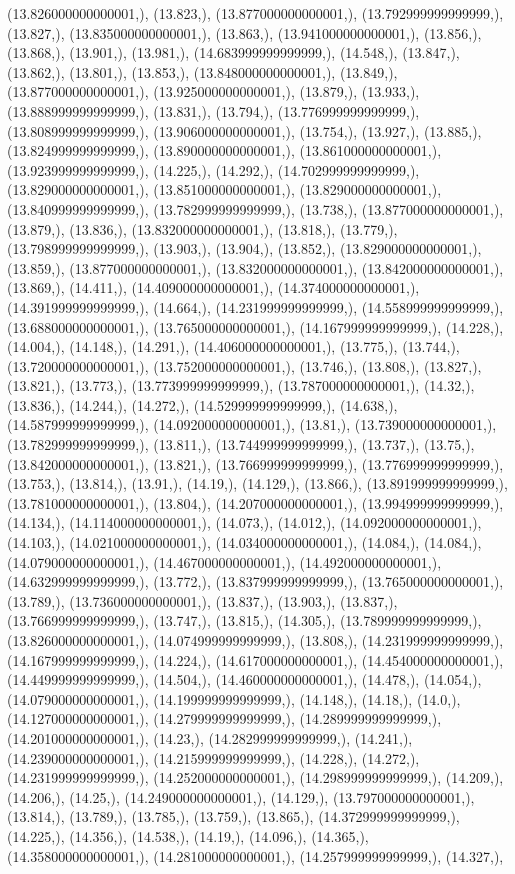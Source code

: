 \documentclass{article}
\begin{document}
(13.826000000000001,), (13.823,), (13.877000000000001,), (13.792999999999999,), (13.827,), (13.835000000000001,), (13.863,), (13.941000000000001,), (13.856,), (13.868,), (13.901,), (13.981,), (14.683999999999999,), (14.548,), (13.847,), (13.862,), (13.801,), (13.853,), (13.848000000000001,), (13.849,), (13.877000000000001,), (13.925000000000001,), (13.879,), (13.933,), (13.888999999999999,), (13.831,), (13.794,), (13.776999999999999,), (13.808999999999999,), (13.906000000000001,), (13.754,), (13.927,), (13.885,), (13.824999999999999,), (13.890000000000001,), (13.861000000000001,), (13.923999999999999,), (14.225,), (14.292,), (14.702999999999999,), (13.829000000000001,), (13.851000000000001,), (13.829000000000001,), (13.840999999999999,), (13.782999999999999,), (13.738,), (13.877000000000001,), (13.879,), (13.836,), (13.832000000000001,), (13.818,), (13.779,), (13.798999999999999,), (13.903,), (13.904,), (13.852,), (13.829000000000001,), (13.859,), (13.877000000000001,), (13.832000000000001,), (13.842000000000001,), (13.869,), (14.411,), (14.409000000000001,), (14.374000000000001,), (14.391999999999999,), (14.664,), (14.231999999999999,), (14.558999999999999,), (13.688000000000001,), (13.765000000000001,), (14.167999999999999,), (14.228,), (14.004,), (14.148,), (14.291,), (14.406000000000001,), (13.775,), (13.744,), (13.720000000000001,), (13.752000000000001,), (13.746,), (13.808,), (13.827,), (13.821,), (13.773,), (13.773999999999999,), (13.787000000000001,), (14.32,), (13.836,), (14.244,), (14.272,), (14.529999999999999,), (14.638,), (14.587999999999999,), (14.092000000000001,), (13.81,), (13.739000000000001,), (13.782999999999999,), (13.811,), (13.744999999999999,), (13.737,), (13.75,), (13.842000000000001,), (13.821,), (13.766999999999999,), (13.776999999999999,), (13.753,), (13.814,), (13.91,), (14.19,), (14.129,), (13.866,), (13.891999999999999,), (13.781000000000001,), (13.804,), (14.207000000000001,), (13.994999999999999,), (14.134,), (14.114000000000001,), (14.073,), (14.012,), (14.092000000000001,), (14.103,), (14.021000000000001,), (14.034000000000001,), (14.084,), (14.084,), (14.079000000000001,), (14.467000000000001,), (14.492000000000001,), (14.632999999999999,), (13.772,), (13.837999999999999,), (13.765000000000001,), (13.789,), (13.736000000000001,), (13.837,), (13.903,), (13.837,), (13.766999999999999,), (13.747,), (13.815,), (14.305,), (13.789999999999999,), (13.826000000000001,), (14.074999999999999,), (13.808,), (14.231999999999999,), (14.167999999999999,), (14.224,), (14.617000000000001,), (14.454000000000001,), (14.449999999999999,), (14.504,), (14.460000000000001,), (14.478,), (14.054,), (14.079000000000001,), (14.199999999999999,), (14.148,), (14.18,), (14.0,), (14.127000000000001,), (14.279999999999999,), (14.289999999999999,), (14.201000000000001,), (14.23,), (14.282999999999999,), (14.241,), (14.239000000000001,), (14.215999999999999,), (14.228,), (14.272,), (14.231999999999999,), (14.252000000000001,), (14.298999999999999,), (14.209,), (14.206,), (14.25,), (14.249000000000001,), (14.129,), (13.797000000000001,), (13.814,), (13.789,), (13.785,), (13.759,), (13.865,), (14.372999999999999,), (14.225,), (14.356,), (14.538,), (14.19,), (14.096,), (14.365,), (14.358000000000001,), (14.281000000000001,), (14.257999999999999,), (14.327,), 
\end{document}
